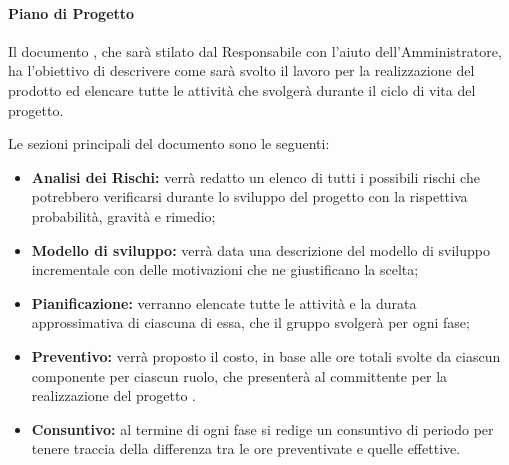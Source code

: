 \paragraph{Piano di Progetto}
Il documento \PdP, che sarà stilato dal Responsabile con l'aiuto dell'Amministratore, ha l'obiettivo di descrivere come sarà svolto il lavoro per la realizzazione del prodotto ed elencare tutte le attività che \Gruppo{} svolgerà durante il ciclo di vita del progetto.


Le sezioni principali del documento sono le seguenti:
\begin{itemize}
	\item \textbf{Analisi dei Rischi:} verrà redatto un elenco di tutti i possibili rischi che potrebbero verificarsi durante lo sviluppo del progetto con la rispettiva probabilità, gravità e rimedio;
	\item \textbf{Modello di sviluppo:} verrà data una descrizione del modello di sviluppo incrementale con delle motivazioni che ne giustificano la scelta;
	\item \textbf{Pianificazione:} verranno elencate tutte le attività e la durata approssimativa di ciascuna di essa, che il gruppo svolgerà per ogni fase;
	\item \textbf{Preventivo:} verrà proposto il costo, in base alle ore totali svolte da ciascun componente per ciascun ruolo, che \Gruppo{} presenterà al committente per la realizzazione del progetto \NomeProgetto{}.
	\item \textbf{Consuntivo:} al termine di ogni fase si redige un consuntivo di periodo per tenere traccia della differenza tra le ore preventivate e quelle effettive.
\end{itemize}